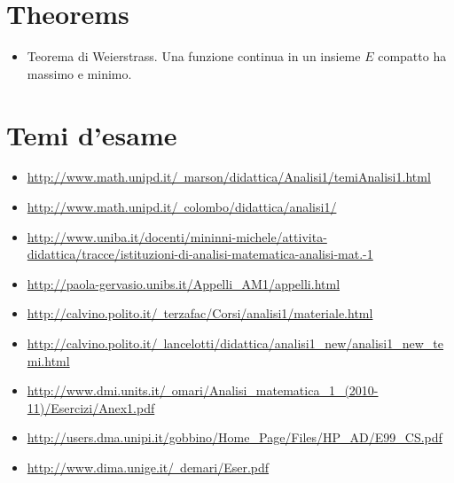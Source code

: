 \documentclass[a4paper,10pt]{article}
\begin{document}
\section{Theorems}
\begin{itemize}
 \item Teorema di Weierstrass. Una funzione continua in un insieme $E$ compatto ha massimo e minimo.
\end{itemize}


\section{Temi d'esame}
\begin{itemize}
 \item \href{http://www.math.unipd.it/~marson/didattica/Analisi1/temiAnalisi1.html}{http://www.math.unipd.it/~marson/didattica/Analisi1/temiAnalisi1.html}
 \item \href{http://www.math.unipd.it/~colombo/didattica/analisi1/}{http://www.math.unipd.it/~colombo/didattica/analisi1/}
 \item \href{http://www.uniba.it/docenti/mininni-michele/attivita-didattica/tracce/istituzioni-di-analisi-matematica-analisi-mat.-1}{http://www.uniba.it/docenti/mininni-michele/attivita-didattica/tracce/istituzioni-di-analisi-matematica-analisi-mat.-1}
 \item \href{http://paola-gervasio.unibs.it/Appelli_AM1/appelli.html}{http://paola-gervasio.unibs.it/Appelli_AM1/appelli.html}
 \item \href{http://calvino.polito.it/~terzafac/Corsi/analisi1/materiale.html}{http://calvino.polito.it/~terzafac/Corsi/analisi1/materiale.html}
 \item \href{http://calvino.polito.it/~lancelotti/didattica/analisi1_new/analisi1_new_temi.html}{http://calvino.polito.it/~lancelotti/didattica/analisi1_new/analisi1_new_temi.html}
 \item \href{http://www.dmi.units.it/~omari/Analisi_matematica_1_(2010-11)/Esercizi/Anex1.pdf}{http://www.dmi.units.it/~omari/Analisi_matematica_1_(2010-11)/Esercizi/Anex1.pdf}
 \item \href{http://users.dma.unipi.it/gobbino/Home_Page/Files/HP_AD/E99_CS.pdf}{http://users.dma.unipi.it/gobbino/Home_Page/Files/HP_AD/E99_CS.pdf}
 \item \href{http://www.dima.unige.it/~demari/Eser.pdf}{http://www.dima.unige.it/~demari/Eser.pdf}
\end{itemize}
\end{document}
